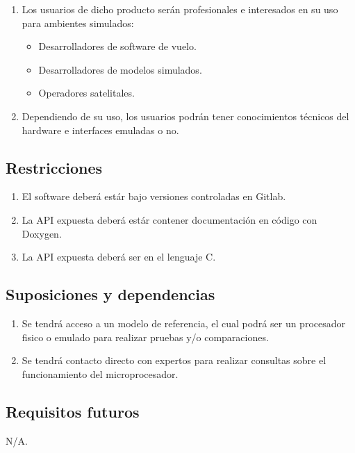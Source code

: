 \documentclass[
  11pt, %
  codirector, %
]{charter}
\begin{document}
\begin{enumerate}
\item Los usuarios de dicho producto serán profesionales e interesados en su uso para ambientes simulados:
  \begin{itemize}
  \item Desarrolladores de software de vuelo.
  \item Desarrolladores de modelos simulados.
  \item Operadores satelitales.
  \end{itemize}
\item Dependiendo de su uso, los usuarios podrán tener conocimientos técnicos del hardware e interfaces emuladas o no.
\end{enumerate}

\subsection{Restricciones}
\label{sec:org5ca5790}

\begin{enumerate}
\item El software deberá estár bajo versiones controladas en Gitlab.
\item La API expuesta deberá estár contener documentación en código con Doxygen.
\item La API expuesta deberá ser en el lenguaje C.
\end{enumerate}

\subsection{Suposiciones y dependencias}
\label{sec:org0ae23fe}

\begin{enumerate}
\item Se tendrá acceso a un modelo de referencia, el cual podrá ser un procesador fisico o emulado para realizar pruebas y/o comparaciones.
\item Se tendrá contacto directo con expertos para realizar consultas sobre el funcionamiento del microprocesador.
\end{enumerate}

\subsection{Requisitos futuros}
\label{sec:org33cfcdb}

N/A.
\end{document}

